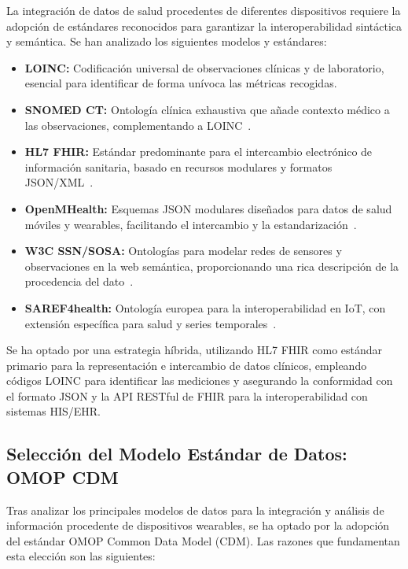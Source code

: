 La integración de datos de salud procedentes de diferentes dispositivos requiere la adopción de estándares reconocidos para garantizar la interoperabilidad sintáctica y semántica. Se han analizado los siguientes modelos y estándares:

\begin{itemize}
    \item \textbf{LOINC:} Codificación universal de observaciones clínicas y de laboratorio, esencial para identificar de forma unívoca las métricas recogidas.
    \item \textbf{SNOMED CT:} Ontología clínica exhaustiva que añade contexto médico a las observaciones, complementando a LOINC~\cite{SNOMEDCT}.
    \item \textbf{HL7 FHIR:} Estándar predominante para el intercambio electrónico de información sanitaria, basado en recursos modulares y formatos JSON/XML~\cite{HL7FHIR}.
    \item \textbf{OpenMHealth:} Esquemas JSON modulares diseñados para datos de salud móviles y wearables, facilitando el intercambio y la estandarización~\cite{OpenmHealth}.
    \item \textbf{W3C SSN/SOSA:} Ontologías para modelar redes de sensores y observaciones en la web semántica, proporcionando una rica descripción de la procedencia del dato~\cite{SSN/SOSA}.
    \item \textbf{SAREF4health:} Ontología europea para la interoperabilidad en IoT, con extensión específica para salud y series temporales~\cite{SAREF4health}.
\end{itemize}

Se ha optado por una estrategia híbrida, utilizando HL7 FHIR como estándar primario para la representación e intercambio de datos clínicos, empleando códigos LOINC para identificar las mediciones y asegurando la conformidad con el formato JSON y la API RESTful de FHIR para la interoperabilidad con sistemas HIS/EHR.

\subsection{Selección del Modelo Estándar de Datos: OMOP CDM}

Tras analizar los principales modelos de datos para la integración y análisis de información procedente de dispositivos wearables, se ha optado por la adopción del estándar OMOP Common Data Model (CDM). Las razones que fundamentan esta elección son las siguientes:


